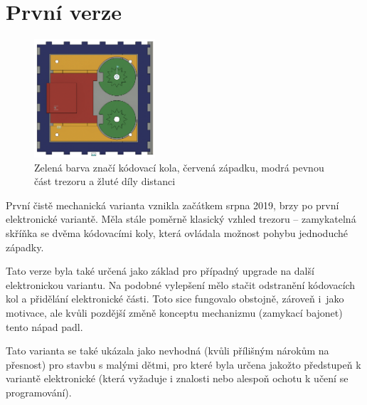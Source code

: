 \section{První verze}

\begin{figure}
    \centering
    \includegraphics[width=0.4\textwidth]{kapitoly/obrazky/M1/mechanizmus.png} %
    \caption{Zelená barva značí kódovací kola, červená západku, modrá pevnou část trezoru a žluté díly distanci \centering}
    \label{fig:M1-mechanizmus}
\end{figure}
První čistě mechanická varianta vznikla začátkem srpna 2019, brzy po první  elektronické variantě.
Měla stále poměrně klasický vzhled trezoru -- zamykatelná skříňka se dvěma  kódovacími koly, která ovládala možnost pohybu jednoduché západky.

Tato verze byla také určená jako základ pro případný upgrade na další elektronickou
variantu. Na podobné vylepšení mělo stačit odstranění kódo\-va\-cích kol a přidělání elektronické části. Toto sice fungovalo obstojně, zároveň 
i~jako motivace, ale kvůli pozdější změně konceptu mechanizmu (zamykací bajonet) tento nápad padl.

Tato varianta se také ukázala jako nevhodná (kvůli přílišným nárokům na přesnost) pro stavbu s malými dětmi, pro které byla určena jakožto předstupeň 
k variantě elektronické (která vyžaduje i znalosti nebo alespoň ochotu k učení se programování).

\newpage